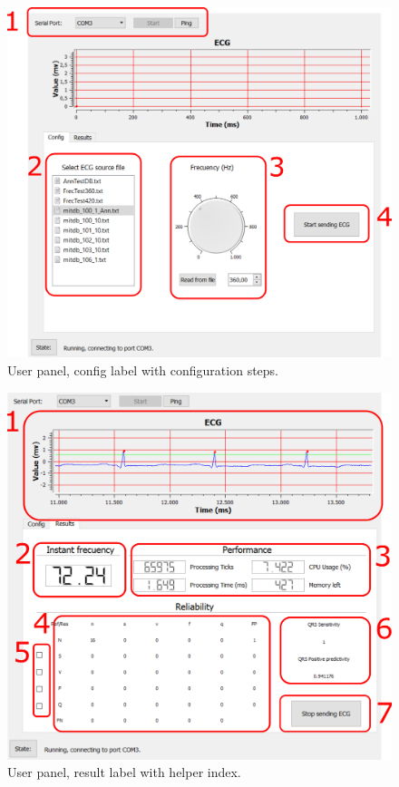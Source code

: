 \begin{figure}[H]
            \centering
                    \includegraphics[width = \linewidth]{figuras/configSteps.png}
            \caption{User panel, config label with configuration steps.}
            \label{fig:EndConfigSteps}
        \end{figure}
        
        \begin{figure}[H]
            \centering
                    \includegraphics[width = \linewidth]{figuras/resultSteps.png}
            \caption{User panel, result label with helper index.}
            \label{fig:EndResultSteps}
        \end{figure}

\chapterend
